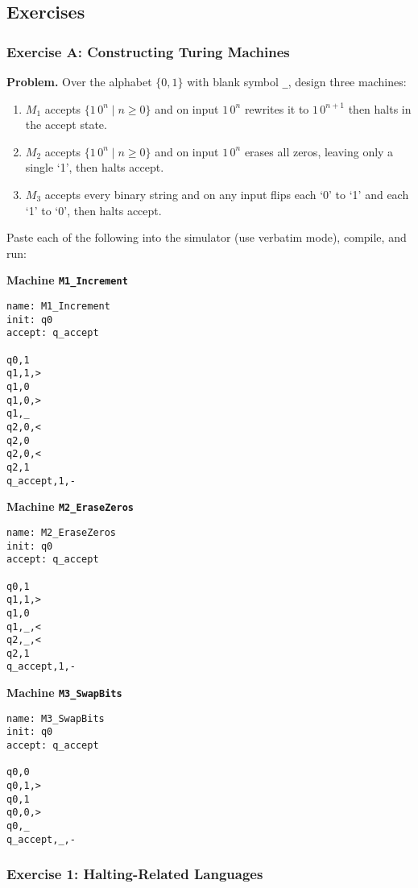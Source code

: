 \documentclass{article}
\theoremstyle{theorem}
\theoremstyle{definition}
\theoremstyle{remark}
\begin{document}
\subsection{Exercises}

\subsubsection*{Exercise A: Constructing Turing Machines}

\textbf{Problem.}  Over the alphabet \(\{0,1\}\) with blank symbol \texttt{\_}, design three machines:

\begin{enumerate}
  \item \(M_{1}\) accepts \(\{1\,0^n\mid n\ge0\}\) and on input \(1\,0^n\) rewrites it to \(1\,0^{n+1}\) then halts in the accept state.
  \item \(M_{2}\) accepts \(\{1\,0^n\mid n\ge0\}\) and on input \(1\,0^n\) erases all zeros, leaving only a single `1', then halts accept.
  \item \(M_{3}\) accepts every binary string and on any input flips each `0' to `1' and each `1' to `0', then halts accept.
\end{enumerate}

Paste each of the following into the simulator (use verbatim mode), compile, and run:

\bigskip
\noindent\textbf{Machine \texttt{M1\_Increment}}  
\begin{verbatim}
name: M1_Increment
init: q0
accept: q_accept

q0,1
q1,1,>
q1,0
q1,0,>
q1,_
q2,0,<
q2,0
q2,0,<
q2,1
q_accept,1,-
\end{verbatim}

\newpage

\bigskip
\noindent\textbf{Machine \texttt{M2\_EraseZeros}}  
\begin{verbatim}
name: M2_EraseZeros
init: q0
accept: q_accept

q0,1
q1,1,>
q1,0
q1,_,<
q2,_,<
q2,1
q_accept,1,-
\end{verbatim}

\bigskip
\noindent\textbf{Machine \texttt{M3\_SwapBits}}  
\begin{verbatim}
name: M3_SwapBits
init: q0
accept: q_accept

q0,0
q0,1,>
q0,1
q0,0,>
q0,_
q_accept,_,-
\end{verbatim}

\bigskip
\subsubsection*{Exercise 1: Halting-Related Languages}
\end{document}
